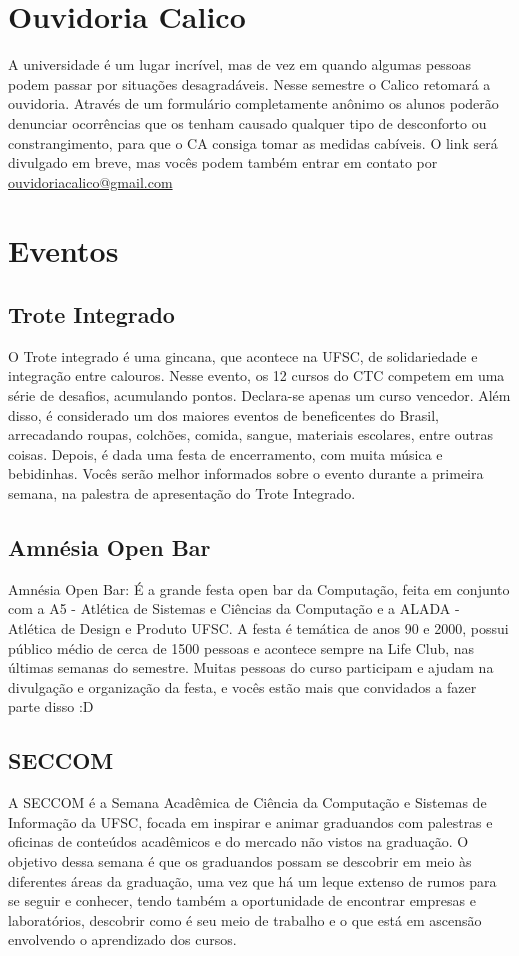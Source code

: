 \documentclass{article}
\begin{document}
\section{Ouvidoria Calico} 
A universidade é um lugar incrível, mas de vez em quando algumas pessoas podem passar por situações desagradáveis. Nesse semestre o Calico retomará a ouvidoria. Através de um formulário completamente anônimo os alunos poderão denunciar ocorrências que os tenham causado qualquer tipo de desconforto ou constrangimento, para que o CA consiga tomar as medidas cabíveis. O link será divulgado em breve, mas vocês podem também entrar em contato por \url{ouvidoriacalico@gmail.com}

\section{Eventos}

\subsection{Trote Integrado}
O Trote integrado é uma gincana, que acontece na UFSC, de solidariedade e integração entre calouros. Nesse evento, os 12 cursos do CTC competem em uma série de desafios, acumulando pontos. Declara-se apenas um curso vencedor. Além disso, é considerado um dos maiores eventos de beneficentes do Brasil, arrecadando roupas, colchões, comida, sangue, materiais escolares, entre outras coisas. Depois, é dada uma festa de encerramento, com muita música e bebidinhas. Vocês serão melhor informados sobre o evento durante a primeira semana, na palestra de apresentação do Trote Integrado. 

\subsection{Amnésia Open Bar} 
Amnésia Open Bar: É a grande festa open bar da Computação, feita em conjunto com a A5 - Atlética de Sistemas e Ciências da Computação e a ALADA - Atlética de Design e Produto UFSC. A festa é temática de anos 90 e 2000, possui público médio de cerca de 1500 pessoas e acontece sempre na Life Club, nas últimas semanas do semestre. Muitas pessoas do curso participam e ajudam na divulgação e organização da festa, e vocês estão mais que convidados a fazer parte disso :D

\subsection{SECCOM} 
A SECCOM é a Semana Acadêmica de Ciência da Computação e Sistemas de Informação da UFSC, focada em inspirar e animar graduandos com palestras e oficinas de conteúdos acadêmicos e do mercado não vistos na graduação. O objetivo dessa semana é que os graduandos possam se descobrir em meio às diferentes áreas da graduação, uma vez que há um leque extenso de rumos para se seguir e conhecer, tendo também a oportunidade de encontrar empresas e laboratórios, descobrir como é seu meio de trabalho e o que está em ascensão envolvendo o aprendizado dos cursos.  
\end{document}
